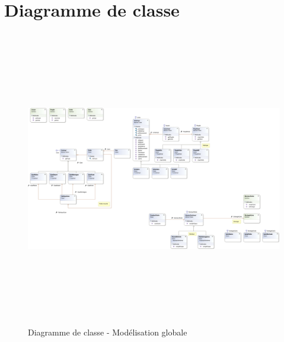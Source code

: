 \documentclass[a4paper,11pt]{article}
\begin{document}
\section{Diagramme de classe}
	\vspace*{0.5cm}
	\lipsum[1]
	\vspace*{0.5cm}
	\begin{figure}[ht!]
		\includegraphics[height=13cm,width=15cm]{classe.png}
		\caption{Diagramme de classe - Modélisation globale}
		\label{fig:classe}
	\end{figure}
	\newpage
\end{document}
